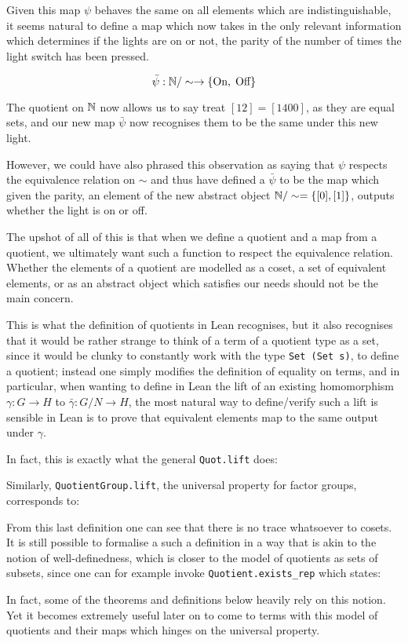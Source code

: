\begin{remark}
    Given this map $\psi$ behaves the same on all elements which are indistinguishable, it seems natural to 
    define a map which now takes in the only relevant information which determines if the lights are on or not,
    the parity of the number of times the light switch has been pressed.
    
    \[
    \bar{\psi} : \mathbb{N} / \sim \rightarrow \{\text{On}, \; \text{Off}\}
    \]

    The quotient on $\mathbb{N}$ now allows us to say treat $[12] = [1400]$, as they are equal sets, and our new map $\bar{\psi}$ now recognises them to be the same
    under this new light. 

    However, we could have also phrased this observation as saying that $\psi$ respects the equivalence relation on $\sim$ and
    thus have defined a $\bar{\psi}$ to be the map which given the parity, an element of the new abstract object $\mathbb{N} / \sim = \{[0], [1]\}$,
    outputs whether the light is on or off. 

    The upshot of all of this is that when we define a quotient and a map from a quotient, we ultimately want such a function to respect the equivalence relation. Whether the elements of a quotient are
    modelled as a coset, a set of equivalent elements, or as an abstract object which satisfies our needs should not be the main concern. 

    This is what the definition of quotients in Lean recognises, but it also recognises that it would be rather strange to think of a term of a quotient type as a set, since it would be clunky to  constantly work with
    the type \texttt{Set (Set s)}, to define a quotient;  instead one simply modifies the definition of equality on terms, and in particular, when wanting to define in Lean the lift of an existing homomorphism $\gamma : G \rightarrow H$
    to $\bar{\gamma} : G/N \rightarrow H$, the most natural way to define/verify such a lift is sensible in Lean is to prove that equivalent elements map to the same output under $\gamma$.

    In fact, this is exactly what the general \texttt{Quot.lift} does:

 

    Similarly, \texttt{QuotientGroup.lift}, the universal property for factor groups, corresponds to:

    

    From this last definition one can see that there is no trace whatsoever to cosets. It is still possible to formalise a such a
    definition in a way that is akin to the notion of well-definedness, which is closer to the model of quotients as sets of subsets,
    since one can for example invoke \texttt{Quotient.exists\_rep} which states:

   
    
    In fact, some of the theorems and definitions below heavily rely on this notion.
    Yet it becomes extremely useful later on to come to terms with this model of quotients and their maps which
    hinges on the universal property.
    \end{remark}

